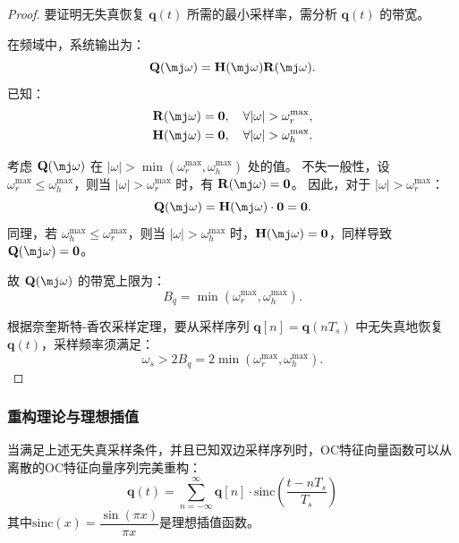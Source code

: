 \begin{proof}
    要证明无失真恢复 $\mathbf{q}(t)$ 所需的最小采样率，需分析 $\mathbf{q}(t)$ 的带宽。

    在频域中，系统输出为：
    \begin{equation}
        \mathbf{Q}(\mj\omega) = \mathbf{H}(\mj\omega) \mathbf{R}(\mj\omega).
    \end{equation}
    已知：
    \begin{align*}
        \mathbf{R}(\mj\omega) & = \mathbf{0}, \quad \forall |\omega| > \omega_r^{\max}, \\
        \mathbf{H}(\mj\omega) & = \mathbf{0}, \quad \forall |\omega| > \omega_h^{\max}.
    \end{align*}

    考虑 $\mathbf{Q}(\mj\omega)$ 在 $|\omega| > \min(\omega_r^{\max}, \omega_h^{\max})$ 处的值。
    不失一般性，设 $\omega_r^{\max} \le \omega_h^{\max}$，则当 $|\omega| > \omega_r^{\max}$ 时，有 $\mathbf{R}(\mj\omega) = \mathbf{0}$。
    因此，对于 $|\omega| > \omega_r^{\max}$：
    \begin{equation}
        \mathbf{Q}(\mj\omega) = \mathbf{H}(\mj\omega) \cdot \mathbf{0} = \mathbf{0}.
    \end{equation}
    同理，若 $\omega_h^{\max} \le \omega_r^{\max}$，则当 $|\omega| > \omega_h^{\max}$ 时，$\mathbf{H}(\mj\omega) = \mathbf{0}$，同样导致 $\mathbf{Q}(\mj\omega) = \mathbf{0}$。

    故 $\mathbf{Q}(\mj\omega)$ 的带宽上限为：
    \begin{equation}
        B_q = \min(\omega_r^{\max}, \omega_h^{\max}).
    \end{equation}

    根据奈奎斯特-香农采样定理，要从采样序列 $\mathbf{q}[n] = \mathbf{q}(nT_s)$ 中无失真地恢复 $\mathbf{q}(t)$，采样频率须满足：
    \begin{equation}
        \omega_s > 2 B_q = 2 \min(\omega_r^{\max}, \omega_h^{\max}).
    \end{equation}
\end{proof}

\subsubsection{重构理论与理想插值}

\begin{theorem}[OC特征向量函数的重构]
    当满足上述无失真采样条件，并且已知双边采样序列时，OC特征向量函数可以从离散的OC特征向量序列完美重构：
    \begin{equation}
        \mathbf{q}(t) = \sum_{n=-\infty}^{\infty} \mathbf{q}[n] \cdot \text{sinc}\left(\dfrac{t - nT_s}{T_s}\right)
        \label{eq:ideal-reconstruction}
    \end{equation}
    其中$\text{sinc}(x) = \dfrac{\sin(\pi x)}{\pi x}$是理想插值函数。
\end{theorem}

